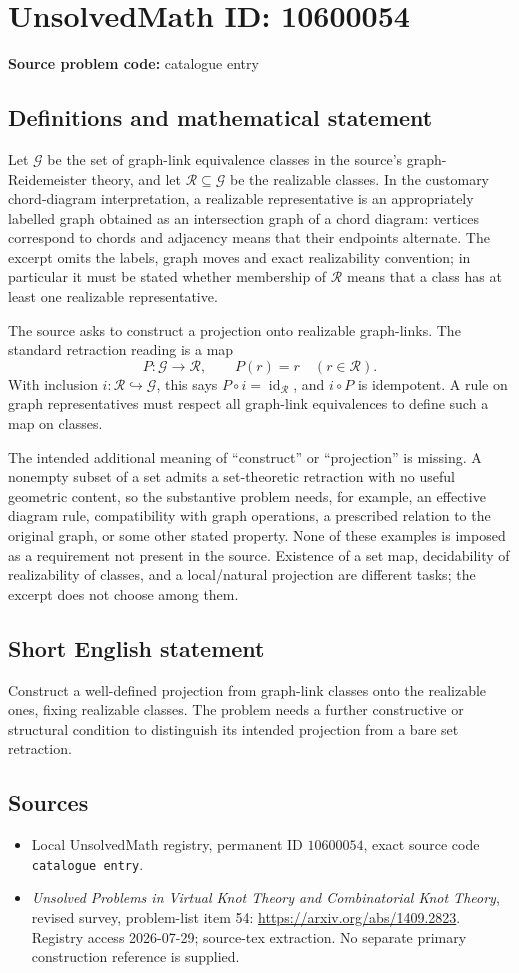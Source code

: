 \documentclass[11pt]{article}
\begin{document}
\section*{UnsolvedMath ID: 10600054}
\textbf{Source problem code:} catalogue entry
\subsection{Definitions and mathematical statement}
Let \(\mathcal G\) be the set of graph-link equivalence classes in the source's graph-Reidemeister theory, and let \(\mathcal R\subseteq\mathcal G\) be the realizable classes. In the customary chord-diagram interpretation, a realizable representative is an appropriately labelled graph obtained as an intersection graph of a chord diagram: vertices correspond to chords and adjacency means that their endpoints alternate. The excerpt omits the labels, graph moves and exact realizability convention; in particular it must be stated whether membership of \(\mathcal R\) means that a class has at least one realizable representative.

The source asks to construct a projection onto realizable graph-links. The standard retraction reading is a map
\[P:\mathcal G\to\mathcal R,\qquad P(r)=r\quad(r\in\mathcal R).\]
With inclusion \(i:\mathcal R\hookrightarrow\mathcal G\), this says \(P\circ i=\operatorname{id}_{\mathcal R}\), and \(i\circ P\) is idempotent. A rule on graph representatives must respect all graph-link equivalences to define such a map on classes.

The intended additional meaning of ``construct'' or ``projection'' is missing. A nonempty subset of a set admits a set-theoretic retraction with no useful geometric content, so the substantive problem needs, for example, an effective diagram rule, compatibility with graph operations, a prescribed relation to the original graph, or some other stated property. None of these examples is imposed as a requirement not present in the source. Existence of a set map, decidability of realizability of classes, and a local/natural projection are different tasks; the excerpt does not choose among them.
\subsection{Short English statement}
Construct a well-defined projection from graph-link classes onto the realizable ones, fixing realizable classes. The problem needs a further constructive or structural condition to distinguish its intended projection from a bare set retraction.
\subsection{Sources}
\begin{itemize}
\item Local UnsolvedMath registry, permanent ID \(10600054\), exact source code \texttt{catalogue entry}.
\item \emph{Unsolved Problems in Virtual Knot Theory and Combinatorial Knot Theory}, revised survey, problem-list item 54: \url{https://arxiv.org/abs/1409.2823}. Registry access 2026-07-29; source-tex extraction. No separate primary construction reference is supplied.
\end{itemize}
\end{document}
